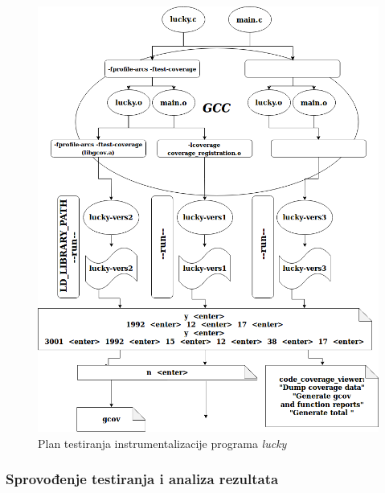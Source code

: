 \documentclass[12pt,oneside]{memoir}
\newcommand{\strano}[1]{\textit{#1}}
\begin{document}
\begin{figure}[!ht]
  \centering
  \includegraphics[width=\textwidth , height=0.9\textheight]{img/lucky_diagram.png}
  \caption{Plan testiranja instrumentalizacije programa \strano{lucky}}
  \label{fig:diag}
\end{figure}

\subsubsection{Sprovođenje testiranja i analiza rezultata}
\end{document}
